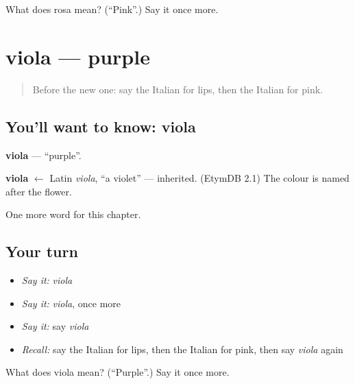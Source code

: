 \begin{tcolorbox}[breakable,colback=teal!4,colframe=teal!35!black,title={Before you move on}]
What does rosa mean? (\textquotedblleft{}Pink\textquotedblright{}.) Say it once more.
\end{tcolorbox}
\section[viola]{viola — purple}

\label{lesson:IT-C123-viola}



\begin{quote}
Before the new one: say the Italian for lips, then the Italian for pink.
\end{quote}

\subsection*{You'll want to know: viola}
\textbf{viola} — \textquotedblleft{}purple\textquotedblright{}.

\begin{cousinweb}
\textbf{viola} $\leftarrow$ Latin \emph{viola}, \textquotedblleft{}a violet\textquotedblright{} — inherited. (EtymDB 2.1) The colour is named after the flower.
\end{cousinweb}

\begin{grammarlens}[title={What you've built}]
One more word for this chapter.
\end{grammarlens}

\subsection*{Your turn}
\begin{itemize}
\raggedright
  \item \emph{Say it:} \emph{viola}
  \item \emph{Say it:} \emph{viola}, once more
  \item \emph{Say it:} say \emph{viola}
  \item \emph{Recall:} say the Italian for lips, then the Italian for pink, then say \emph{viola} again
\end{itemize}

\begin{tcolorbox}[breakable,colback=teal!4,colframe=teal!35!black,title={Before you move on}]
What does viola mean? (\textquotedblleft{}Purple\textquotedblright{}.) Say it once more.
\end{tcolorbox}
